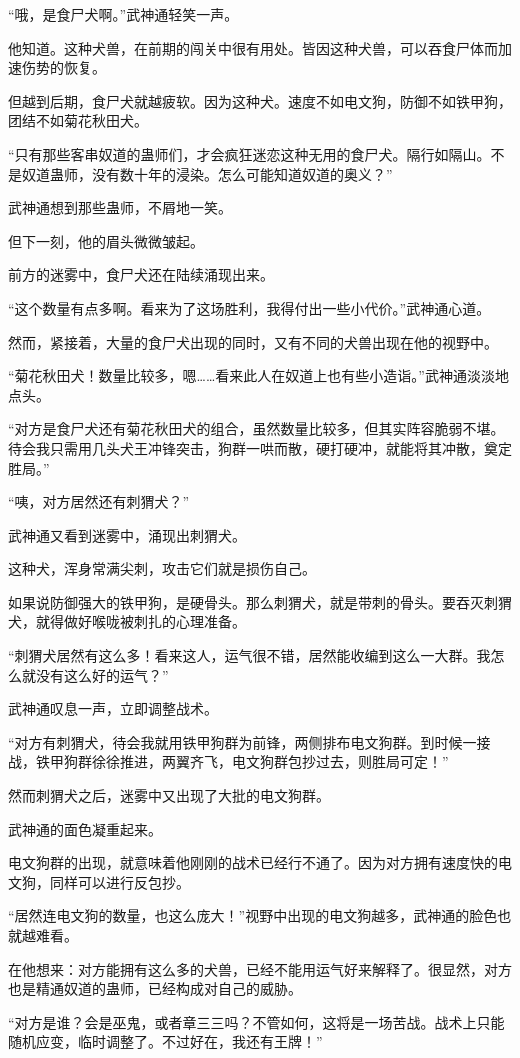 \begin{this_body}
“哦，是食尸犬啊。”武神通轻笑一声。

他知道。这种犬兽，在前期的闯关中很有用处。皆因这种犬兽，可以吞食尸体而加速伤势的恢复。

但越到后期，食尸犬就越疲软。因为这种犬。速度不如电文狗，防御不如铁甲狗，团结不如菊花秋田犬。

“只有那些客串奴道的蛊师们，才会疯狂迷恋这种无用的食尸犬。隔行如隔山。不是奴道蛊师，没有数十年的浸染。怎么可能知道奴道的奥义？”

武神通想到那些蛊师，不屑地一笑。

但下一刻，他的眉头微微皱起。

前方的迷雾中，食尸犬还在陆续涌现出来。

“这个数量有点多啊。看来为了这场胜利，我得付出一些小代价。”武神通心道。

然而，紧接着，大量的食尸犬出现的同时，又有不同的犬兽出现在他的视野中。

“菊花秋田犬！数量比较多，嗯……看来此人在奴道上也有些小造诣。”武神通淡淡地点头。

“对方是食尸犬还有菊花秋田犬的组合，虽然数量比较多，但其实阵容脆弱不堪。待会我只需用几头犬王冲锋突击，狗群一哄而散，硬打硬冲，就能将其冲散，奠定胜局。”

“咦，对方居然还有刺猬犬？”

武神通又看到迷雾中，涌现出刺猬犬。

这种犬，浑身常满尖刺，攻击它们就是损伤自己。

如果说防御强大的铁甲狗，是硬骨头。那么刺猬犬，就是带刺的骨头。要吞灭刺猬犬，就得做好喉咙被刺扎的心理准备。

“刺猬犬居然有这么多！看来这人，运气很不错，居然能收编到这么一大群。我怎么就没有这么好的运气？”

武神通叹息一声，立即调整战术。

“对方有刺猬犬，待会我就用铁甲狗群为前锋，两侧排布电文狗群。到时候一接战，铁甲狗群徐徐推进，两翼齐飞，电文狗群包抄过去，则胜局可定！”

然而刺猬犬之后，迷雾中又出现了大批的电文狗群。

武神通的面色凝重起来。

电文狗群的出现，就意味着他刚刚的战术已经行不通了。因为对方拥有速度快的电文狗，同样可以进行反包抄。

“居然连电文狗的数量，也这么庞大！”视野中出现的电文狗越多，武神通的脸色也就越难看。

在他想来：对方能拥有这么多的犬兽，已经不能用运气好来解释了。很显然，对方也是精通奴道的蛊师，已经构成对自己的威胁。

“对方是谁？会是巫鬼，或者章三三吗？不管如何，这将是一场苦战。战术上只能随机应变，临时调整了。不过好在，我还有王牌！”


\end{this_body}
